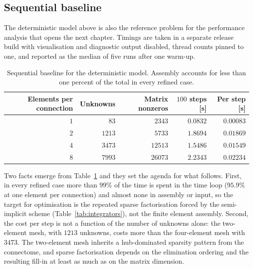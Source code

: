 
\subsection{Sequential baseline}
\label{sec:performance}

The deterministic model above is also the reference problem for the performance
analysis that opens the next chapter. Timings are taken in a separate release
build with visualisation and diagnostic output disabled, thread counts pinned
to one, and reported as the median of five runs after one warm-up.

\begin{table}[htbp]
\centering
\begin{tabular}{rrrrr}
\hline
Elements per connection & Unknowns & Matrix nonzeros & $100$ steps [s] &
Per step [s] \\
\hline
$1$ & $83$   & $2343$  & $0.0832$ & $0.00083$ \\
$2$ & $1213$ & $5733$  & $1.8694$ & $0.01869$ \\
$4$ & $3473$ & $12513$ & $1.5486$ & $0.01549$ \\
$8$ & $7993$ & $26073$ & $2.2343$ & $0.02234$ \\
\hline
\end{tabular}
\caption{Sequential baseline for the deterministic model. Assembly accounts for
less than one percent of the total in every refined case.}
\label{tab:performance}
\end{table}

Two facts emerge from Table~\ref{tab:performance} and they set the agenda for
what follows. First, in every refined case more than $99\%$ of the time is spent in the
time loop ($95.9\%$ at one element per connection) and almost none in
assembly or input, so the target for optimisation is the
repeated sparse factorisation forced by the semi-implicit scheme
(Table~\ref{tab:integrators}), not the finite element assembly. Second, the cost per step is
not a function of the number of unknowns alone: the two-element mesh, with
$1213$ unknowns, costs more than the four-element mesh with $3473$.
The two-element mesh inherits a hub-dominated sparsity pattern from the
connectome, and sparse factorisation depends on the elimination ordering and
the resulting fill-in at least as much as on the matrix dimension.

